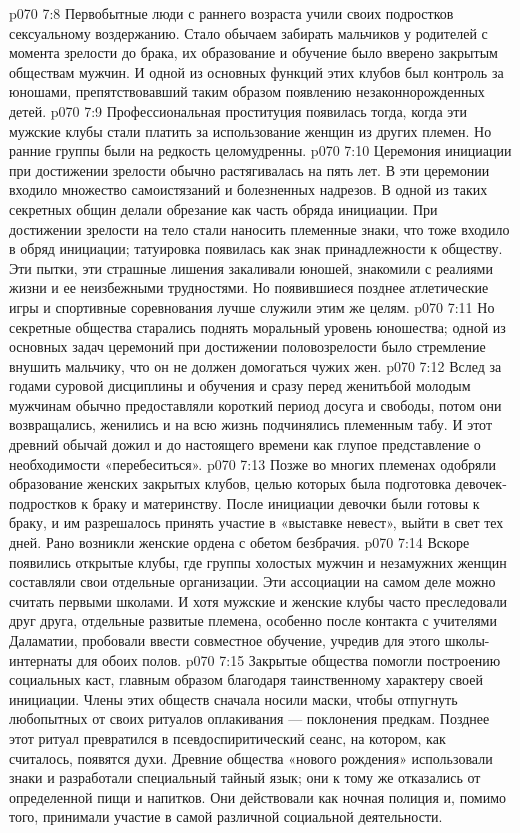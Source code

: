 \vs p070 7:8 \pc Первобытные люди с раннего возраста учили своих подростков сексуальному воздержанию. Стало обычаем забирать мальчиков у родителей с момента зрелости до брака, их образование и обучение было вверено закрытым обществам мужчин. И одной из основных функций этих клубов был контроль за юношами, препятствовавший таким образом появлению незаконнорожденных детей.
\vs p070 7:9 Профессиональная проституция появилась тогда, когда эти мужские клубы стали платить за использование женщин из других племен. Но ранние группы были на редкость целомудренны.
\vs p070 7:10 Церемония инициации при достижении зрелости обычно растягивалась на пять лет. В эти церемонии входило множество самоистязаний и болезненных надрезов. В одной из таких секретных общин делали обрезание как часть обряда инициации. При достижении зрелости на тело стали наносить племенные знаки, что тоже входило в обряд инициации; татуировка появилась как знак принадлежности к обществу. Эти пытки, эти страшные лишения закаливали юношей, знакомили с реалиями жизни и ее неизбежными трудностями. Но появившиеся позднее атлетические игры и спортивные соревнования лучше служили этим же целям.
\vs p070 7:11 Но секретные общества старались поднять моральный уровень юношества; одной из основных задач церемоний при достижении половозрелости было стремление внушить мальчику, что он не должен домогаться чужих жен.
\vs p070 7:12 Вслед за годами суровой дисциплины и обучения и сразу перед женитьбой молодым мужчинам обычно предоставляли короткий период досуга и свободы, потом они возвращались, женились и на всю жизнь подчинялись племенным табу. И этот древний обычай дожил и до настоящего времени как глупое представление о необходимости «перебеситься».
\vs p070 7:13 \pc Позже во многих племенах одобряли образование женских закрытых клубов, целью которых была подготовка девочек\hyp{}подростков к браку и материнству. После инициации девочки были готовы к браку, и им разрешалось принять участие в «выставке невест», выйти в свет тех дней. Рано возникли женские ордена с обетом безбрачия.
\vs p070 7:14 Вскоре появились открытые клубы, где группы холостых мужчин и незамужних женщин составляли свои отдельные организации. Эти ассоциации на самом деле можно считать первыми школами. И хотя мужские и женские клубы часто преследовали друг друга, отдельные развитые племена, особенно после контакта с учителями Даламатии, пробовали ввести совместное обучение, учредив для этого школы\hyp{}интернаты для обоих полов.
\vs p070 7:15 \pc Закрытые общества помогли построению социальных каст, главным образом благодаря таинственному характеру своей инициации. Члены этих обществ сначала носили маски, чтобы отпугнуть любопытных от своих ритуалов оплакивания --- поклонения предкам. Позднее этот ритуал превратился в псевдоспиритический сеанс, на котором, как считалось, появятся духи. Древние общества «нового рождения» использовали знаки и разработали специальный тайный язык; они к тому же отказались от определенной пищи и напитков. Они действовали как ночная полиция и, помимо того, принимали участие в самой различной социальной деятельности.
